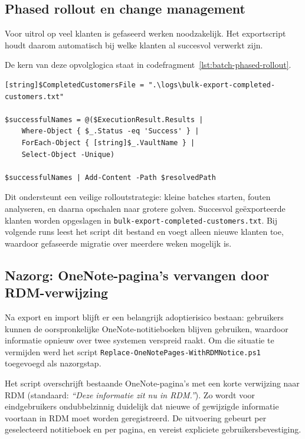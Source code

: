 \subsection{Phased rollout en change management}
\label{subsec:topic-phased-rollout}

Voor uitrol op veel klanten is gefaseerd werken noodzakelijk. Het exportscript houdt daarom automatisch bij welke klanten al succesvol verwerkt zijn.

De kern van deze opvolglogica staat in codefragment~\ref{lst:batch-phased-rollout}.

\begin{listing}[htbp]
\begin{lstlisting}
[string]$CompletedCustomersFile = ".\logs\bulk-export-completed-customers.txt"

$successfulNames = @($ExecutionResult.Results |
    Where-Object { $_.Status -eq 'Success' } |
    ForEach-Object { [string]$_.VaultName } |
    Select-Object -Unique)

$successfulNames | Add-Content -Path $resolvedPath
\end{lstlisting}
\caption{Persistente opvolging van succesvol afgewerkte klanten voor gefaseerde uitrol}
\label{lst:batch-phased-rollout}
\end{listing}

Dit ondersteunt een veilige rolloutstrategie: kleine batches starten, fouten analyseren, en daarna opschalen naar grotere golven. Succesvol geëxporteerde klanten worden opgeslagen in \texttt{bulk-export-completed-customers.txt}. Bij volgende runs leest het script dit bestand en voegt alleen nieuwe klanten toe, waardoor gefaseerde migratie over meerdere weken mogelijk is.

\subsection{Nazorg: OneNote-pagina's vervangen door RDM-verwijzing}
\label{subsec:topic-onenote-rdm-notice}

Na export en import blijft er een belangrijk adoptierisico bestaan: gebruikers kunnen de oorspronkelijke OneNote-notitieboeken blijven gebruiken, waardoor informatie opnieuw over twee systemen verspreid raakt. Om die situatie te vermijden werd het script \texttt{Replace-OneNotePages-WithRDMNotice.ps1} toegevoegd als nazorgstap.

Het script overschrijft bestaande OneNote-pagina's met een korte verwijzing naar RDM (standaard: \emph{``Deze informatie zit nu in RDM.''}). Zo wordt voor eindgebruikers ondubbelzinnig duidelijk dat nieuwe of gewijzigde informatie voortaan in RDM moet worden geregistreerd. De uitvoering gebeurt per geselecteerd notitieboek en per pagina, en vereist expliciete gebruikersbevestiging.

